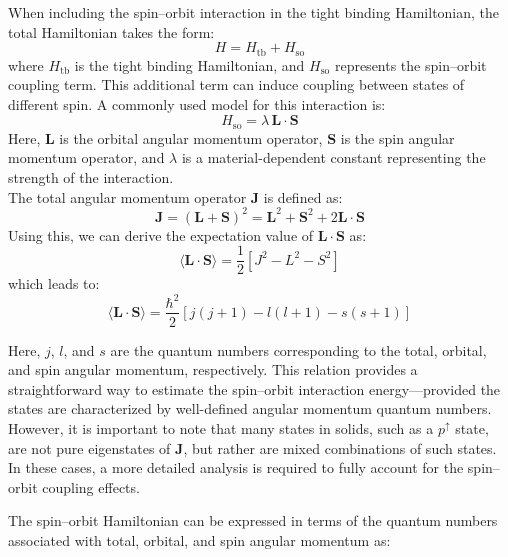 When including the spin–orbit interaction in the tight binding Hamiltonian, the total Hamiltonian takes the form:
\begin{equation}
	H = H_{\text{tb}} + H_{\text{so}}
\end{equation}
\noindent
where \( H_{\text{tb}} \) is the tight binding Hamiltonian, and \( H_{\text{so}} \) represents the spin–orbit coupling term. This additional term can induce coupling between states of different spin. A commonly used model for this interaction is:
\begin{equation*}
	H_{\text{so}} = \lambda \, \mathbf{L} \cdot \mathbf{S}
\end{equation*}
\noindent
Here, \( \mathbf{L} \) is the orbital angular momentum operator, \( \mathbf{S} \) is the spin angular momentum operator, and \( \lambda \) is a material-dependent constant representing the strength of the interaction.\\
The total angular momentum operator \( \mathbf{J} \) is defined as:
\begin{equation}
	\mathbf{J} = (\mathbf{L} + \mathbf{S})^2 = \mathbf{L}^2 + \mathbf{S}^2 + 2 \mathbf{L} \cdot \mathbf{S}
\end{equation}
\noindent
Using this, we can derive the expectation value of \( \mathbf{L} \cdot \mathbf{S} \) as:
\begin{equation*}
	\langle \mathbf{L} \cdot \mathbf{S} \rangle = \frac{1}{2} \left[ J^2 - L^2 - S^2 \right]
\end{equation*}
\noindent
which leads to:
\begin{equation}
	\langle \mathbf{L} \cdot \mathbf{S} \rangle = \frac{\hbar^2}{2} \left[ j(j + 1) - l(l + 1) - s(s + 1) \right]
\end{equation}

\noindent
Here, \( j \), \( l \), and \( s \) are the quantum numbers corresponding to the total, orbital, and spin angular momentum, respectively. This relation provides a straightforward way to estimate the spin–orbit interaction energy—provided the states are characterized by well-defined angular momentum quantum numbers.\\
However, it is important to note that many states in solids, such as a \( p^\uparrow \) state, are not pure eigenstates of \( \mathbf{J} \), but rather are mixed combinations of such states. In these cases, a more detailed analysis is required to fully account for the spin–orbit coupling effects.

The spin–orbit Hamiltonian can be expressed in terms of the quantum numbers associated with total, orbital, and spin angular momentum as:

